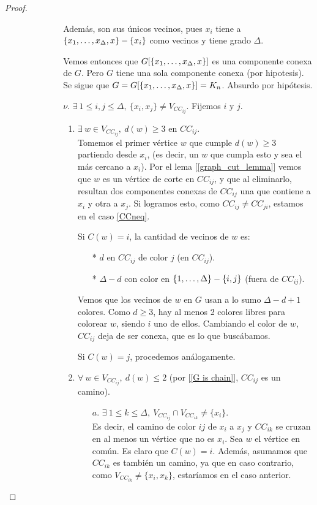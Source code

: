 \begin{proof}
\begin{enumerate}
\begin{enumerate}
\begin{enumerate}
\begin{itemize}
        Además, son sus únicos vecinos, pues $x_i$ tiene a $\{x_1, \mathellipsis, x_\Delta, x\} - \{x_i\}$ como vecinos y tiene grado $\Delta$.
        
        Vemos entonces que $G[\{x_1, \mathellipsis, x_\Delta, x\}]$ es una componente conexa de $G$. Pero $G$ tiene una sola componente conexa (por hipotesis). Se sigue que $G = G[\{x_1,\mathellipsis,x_\Delta, x\}] = K_n$. Absurdo por hipótesis.

        \item[$\nu.$] \label{nu} $\exists~ 1 \le i,j \le \Delta,~ \{x_i,x_j\} \neq V_{CC_{ij}}$. Fijemos $i$ y $j$.
        \begin{enumerate}
            \item $\exists~ w \in V_{CC_{ij}},~ d(w) \ge 3$  en $CC_{ij}$.\\
            Tomemos el primer vértice $w$ que cumple $d(w) \ge 3$ partiendo desde $x_i$, (es decir, un $w$ que cumpla esto y sea el más cercano a $x_i$). Por el lema [\ref{graph_cut_lemma}] vemos que $w$ es un vértice de corte en $CC_{ij}$, y que al eliminarlo, resultan dos componentes conexas de $CC_{ij}$ una que contiene a $x_i$ y otra a $x_j$. Si logramos esto, como $CC_{ij} \neq CC_{ji}$, estamos en el caso \ref{CCneq}.
            
            Si $C(w) = i$, la cantidad de vecinos de $w$ es:
            \begin{itemize}
                \item[*] $d$ en $CC_{ij}$ de color $j$ (en $CC_{ij}$).
                \item[*] $\Delta - d$ con color en $\{1, \mathellipsis, \Delta\} - \{i,j\}$ (fuera de $CC_{ij}$).
            \end{itemize}
        Vemos que los vecinos de $w$ en $G$ usan a lo sumo $\Delta - d + 1$ colores.
        Como $d \ge 3$, hay al menos 2 colores libres para colorear $w$, siendo $i$ uno de ellos. Cambiando el color de $w$, $CC_{ij}$ deja de ser conexa, que es lo que buscábamos.
        
        Si $C(w) = j$, procedemos análogamente.\\
    
        \item $\forall~ w \in V_{CC_{ij}},~ d(w) \le 2$ (por [\ref{G is chain}], $CC_{ij}$ es un camino).
        \begin{itemize}
            \item[$a.$] \label{CCdisjoint} $\exists~ 1 \le k \le \Delta,~ V_{CC_{ij}} \cap V_{CC_{ik}} \neq \{x_i\}$.\\
            Es decir, el camino de color $ij$ de $x_i$ a $x_j$ y $CC_{ik}$ se cruzan en al menos un vértice que no es $x_i$. Sea $w$ el vértice en común. Es claro que $C(w) = i$. Además, asumamos que $CC_{ik}$ es también un camino, ya que en caso contrario, como $V_{CC_{ik}} \neq \{x_i, x_k\}$, estaríamos en el caso anterior.
            

\end{itemize}
\end{enumerate}
\end{itemize}
\end{enumerate}
\end{enumerate}
\end{enumerate}
\end{proof}

